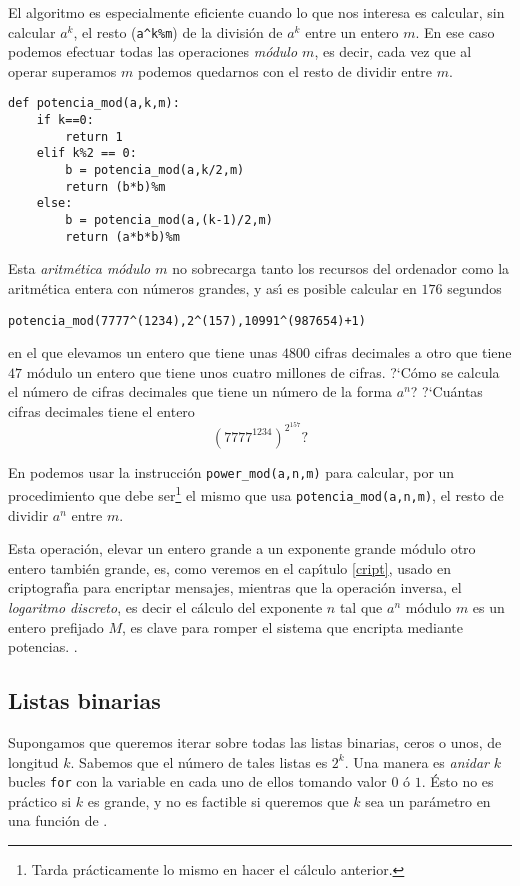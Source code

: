 El algoritmo es especialmente eficiente cuando lo que nos interesa es calcular,
sin calcular $a^k$, el resto (\lstinline|a^k%m|) de la divisi\'on de $a^k$ entre
un entero $m$. En ese caso podemos efectuar todas las operaciones {\itshape
m\'odulo $m$}, es decir, cada vez que al operar superamos $m$ podemos quedarnos
con el resto de dividir entre $m$.  
 
\begin{lstlisting}[columns=spaceflexible]
def potencia_mod(a,k,m):
    if k==0:
        return 1
    elif k%2 == 0:
        b = potencia_mod(a,k/2,m)
        return (b*b)%m
    else:
        b = potencia_mod(a,(k-1)/2,m)
        return (a*b*b)%m
\end{lstlisting}


Esta {\itshape aritm\'etica m\'odulo $m$} no
sobrecarga tanto los recursos del ordenador como la aritm\'etica entera con
n\'umeros grandes, y as\'{\i} es posible calcular en $176$ segundos 
 \begin{center}
 \lstinline|potencia_mod(7777^(1234),2^(157),10991^(987654)+1)|
 \end{center}
 \noindent en el que elevamos un entero que tiene unas $4800$ cifras decimales a
otro que tiene $47$ m\'odulo un entero que tiene unos cuatro millones de
cifras. ?`C\'omo se calcula el n\'umero de cifras decimales que tiene un
n\'umero de la forma $a^n$? ?`Cu\'antas cifras decimales tiene el entero 
\[(7777^{1234})^{2^{157}}?\]

En {\sage} podemos usar la instrucci\'on \lstinline|power_mod(a,n,m)| para
calcular, por un procedimiento que debe ser\footnote{Tarda pr\'acticamente lo
mismo en hacer el c\'alculo anterior.}  el mismo que usa
\lstinline|potencia_mod(a,n,m)|, el resto de dividir $a^n$ entre $m$.



Esta operaci\'on, elevar un entero grande a un exponente grande m\'odulo otro
entero tambi\'en grande, es, como veremos en el cap\'{\i}tulo \ref{cript}, 
usado en criptograf\'{\i}a para encriptar mensajes, mientras que la
operaci\'on inversa, el {\itshape logaritmo discreto}, es decir el c\'alculo del
exponente $n$ tal que $a^n$ m\'odulo $m$ es un entero prefijado $M$, es clave
para romper el sistema que encripta mediante potencias. . 


\subsection{Listas binarias}
Supongamos que queremos iterar sobre todas las listas binarias, ceros o unos, de
longitud $k$. Sabemos que el n\'umero de tales listas es  $2^k.$  Una manera es
{\itshape anidar} $k$ bucles \lstinline|for| con la variable en cada uno de
ellos
tomando valor $0$ \'o $1$. \'Esto no es pr\'actico si $k$ es grande, y no es
factible si queremos que $k$ sea un par\'ametro en una funci\'on de \sage. 


